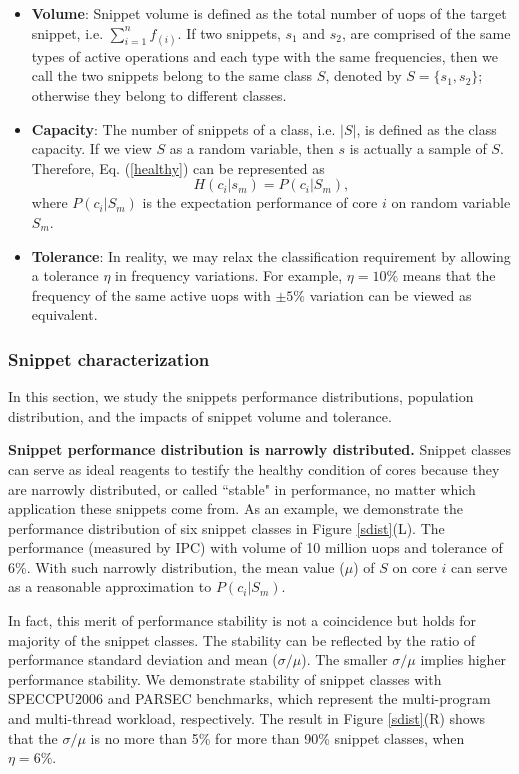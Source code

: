 \begin{itemize}
    \item \textbf{Volume}: Snippet volume is defined as the total number of uops of the target snippet, i.e. $\sum_{i=1}^n f_{(i)} $. If two snippets, $s_1$ and $s_2$, are comprised of the same types of active operations and each type with the same frequencies, then we call the two snippets  belong to the same class $S$, denoted by $S=\{s_1, s_2\}$; otherwise they belong to different classes.

    \item \textbf{Capacity}: The number of snippets of a class, i.e. $|S|$, is defined as the class capacity. If we view $S$ as a random variable, then $s$ is actually a sample of $S$. Therefore, Eq. (\ref{healthy}) can be represented as
        \begin{equation}
            H(c_i|s_m)=P(c_i|S_m), \label{healthy2}
        \end{equation}
        where  $P(c_i|S_m)$ is the expectation performance of core $i$ on random variable $S_m$.

    \item \textbf{Tolerance}: In reality, we may relax the classification requirement by allowing a tolerance $\eta$ in frequency variations.  For example, $\eta=10\%$ means that the frequency of the same active uops with $\pm5\%$ variation can be viewed as equivalent.
\end{itemize}

\subsubsection{Snippet characterization}
In this section, we study the snippets performance distributions, population distribution, and the impacts of snippet volume and tolerance. 

\textbf{Snippet performance distribution is narrowly distributed.} Snippet classes can serve as ideal reagents to testify the healthy condition of cores because they are narrowly distributed, or called ``stable" in performance, no matter which application these snippets come from. As an example, we demonstrate the performance distribution of six snippet classes in Figure \ref{sdist}(L). The performance (measured by IPC) with volume of 10 million uops and tolerance of 6\%.   With such narrowly distribution, the mean value ($\mu$) of  $S$  on core $i$ can serve as a reasonable approximation to $P(c_i|S_m)$.

In fact, this merit of performance stability  is not a coincidence but  holds for majority of the snippet classes.  The stability can be reflected by the ratio of performance standard deviation and mean ($\sigma/\mu$).  The smaller  $\sigma/\mu$ implies higher performance stability.  We demonstrate stability of snippet classes with SPECCPU2006 and PARSEC benchmarks, which represent the multi-program and multi-thread workload, respectively. The result in Figure \ref{sdist}(R) shows that the $\sigma/\mu$ is no more than 5\% for more than 90\% snippet classes, when $\eta=6\%$.


